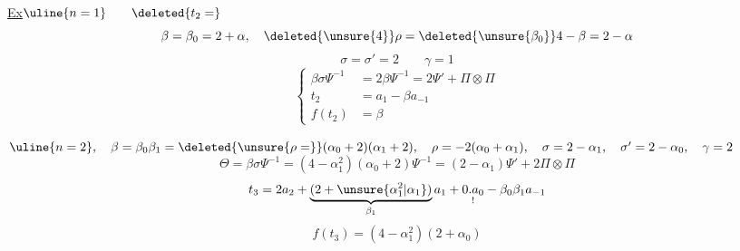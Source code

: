 \uline{Ex}\qquad\(\uline{n=1}\qquad\deleted{t_2=}\)
\[
\beta=\beta_0=2+\alpha,\quad\deleted{\unsure{4}}
\rho=\deleted{\unsure{\beta_0}}4-\beta=2-\alpha
\]
\[
\sigma=\sigma'=2\qquad\gamma=1
\]
\[
\left\{\begin{aligned}
\beta\sigma\Psi^{-1}&=2\beta\Psi^{-1}=2\Psi'+\Pi\otimes\Pi\\
t_2&=a_1-\beta a_{-1}\\
f(t_2)&=\beta
\end{aligned}\right.
\]

\(\uline{n=2},\quad
\beta=\beta_0\beta_1=\deleted{\unsure{\rho=}}(\alpha_0+2)(\alpha_1+2),\quad
\rho=-2(\alpha_0+\alpha_1),\quad
\sigma=2-\alpha_1,\quad\sigma'=2-\alpha_0,\quad\gamma=2\)
\[
\Theta=\beta\sigma\Psi^{-1}
=(4-\alpha_1^2)(\alpha_0+2)\Psi^{-1}
=(2-\alpha_1)\Psi'+2\Pi\otimes\Pi
\]
\[
t_3=2a_2+\underbrace{(2+\unsure{\alpha_1^2|\alpha_1})}_{\beta_1}a_1
+\underset{!}{0.a_0}-\beta_0\beta_1a_{-1}
\]
\[
f(t_3)=(4-\alpha_1^2)(2+\alpha_0)
\]

